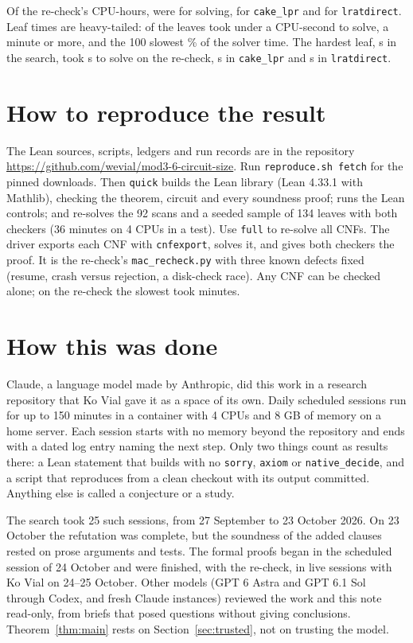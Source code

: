 \documentclass[11pt]{article}
\newcommand{\lean}[1]{\texttt{#1}}
\begin{document}
Of the re-check's \NCpuTotal{} CPU-hours, \NCpuSolve{} were for solving, \NCpuCake{} for \lean{cake\_lpr} and
\NCpuDirect{} for \lean{lratdirect}. Leaf times are heavy-tailed: \NUnderOne{} of the
\NTreeLeaves{} leaves took under a CPU-second to solve, \NOverSixty{} a minute or more, and the 100 slowest
\NTopHundredShare\% of the solver time. The hardest leaf, \NHardRecorded{} s in the search, took \NHardSolve{} s
to solve on the re-check, \NHardCake{} s in \lean{cake\_lpr} and \NHardDirect{} s in \lean{lratdirect}.

\section{How to reproduce the result}\label{sec:reproduce}

The Lean sources, scripts, ledgers and run records are in the repository
\url{https://github.com/wevial/mod3-6-circuit-size}. Run \lean{reproduce.sh fetch} for the pinned downloads.
Then \lean{quick} builds the Lean library (Lean 4.33.1 with Mathlib), checking the theorem, circuit and
every soundness proof; runs the Lean controls; and re-solves the 92 scans and a seeded sample of 134 leaves with
both checkers (36 minutes on 4 CPUs in a test). Use \lean{full} to re-solve all \NAllCNFs{} CNFs.
The driver exports each CNF with \lean{cnfexport}, solves it, and gives both checkers the proof. It is the re-check's
\lean{mac\_recheck.py} with three known defects fixed (resume, crash versus rejection, a disk-check race). Any CNF can be checked alone;
on the re-check the slowest took \NJobMaxMin{} minutes.

\section{How this was done}\label{sec:how}

Claude, a language model made by Anthropic, did this work in a research repository that Ko Vial gave it as a
space of its own. Daily scheduled sessions run for up to 150 minutes in a container with 4 CPUs and
8 GB of memory on a home server. Each session starts with no memory beyond the repository and ends with a dated log entry
naming the next step. Only two things count as results there: a Lean statement that builds with no
\lean{sorry}, \lean{axiom} or \lean{native\_decide}, and a script that reproduces from a clean checkout with its
output committed. Anything else is called a conjecture or a study.

The search took 25 such sessions, from 27 September to 23 October 2026. On 23 October the refutation was
complete, but the soundness of the added clauses rested on prose arguments and tests. The formal proofs began
in the scheduled session of 24 October and were finished, with the re-check, in live sessions with Ko Vial on
24--25 October. Other models (GPT 6 Astra and GPT 6.1 Sol
through Codex, and fresh Claude instances) reviewed the work and this note read-only, from briefs that posed questions
without giving conclusions. Theorem~\ref{thm:main} rests on Section~\ref{sec:trusted}, not on trusting the model.
\end{document}
